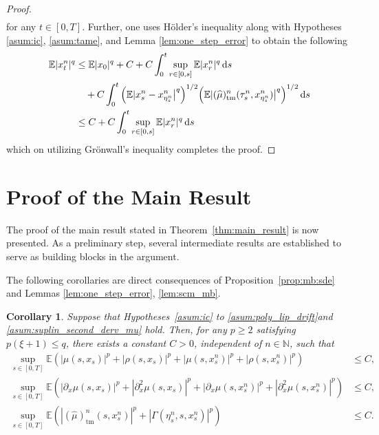 \documentclass[reqno,  oneside, 12pt]{amsart}
\newtheorem{cor}{Corollary}[section]
\newcommand{\E}{\mathbb E}
\begin{document}
\begin{proof}
\begin{align}
	\end{align}
	for any $t\in[ 0, T].$  Further, one uses 	H\"older's inequality along with Hypotheses \ref{asum:ic}, \ref{asum:tame}, and Lemma \ref{lem:one_step_error} to obtain  the following
	\begin{align*}
		\E|x_t^n|^{q}
		&  \leq  \E|x_0|^{q}+C+C\int_0^t\sup_{ r\in[0,s]}\E|x_r^{n}|^{q}\,\mathrm{d}s \notag
		\\
		&\quad+ C\int_{0}^{t}\Big(\E|x_s^{n}-x_{\eta^n_s}^{n}\big|^{{q}}\Big)^{1/2}\Big(\E|(\widehat\mu)_{\mathrm{tm}}^{n}(\tau^n_s,x_{\eta^n_s}^{n})\big|^{{q}}\Big)^{1/2}  \,\mathrm{d}s \notag
		\\
		&  \leq  C+C\int_0^t\sup_{ r\in[0,s]}\E|x_r^{n}|^{q}\,\mathrm{d}s  \notag
	\end{align*}
	which on utilizing  Gr\"onwall's inequality  completes the proof.
\end{proof} 


\section{Proof of the Main  Result} \label{sec:convergence_rate}
The proof of the main result stated in Theorem~\ref{thm:main_result} is now presented. As a preliminary step, several intermediate results are established to serve as building blocks in the argument.

The following corollaries are direct consequences of Proposition~\ref{prop:mb:sde} and Lemmas  \ref{lem:one_step_error}, \ref{lem:scm_mb}.
\begin{cor} \label{cor:_coefficients_mb}
	Suppose that Hypotheses~\mbox{\normalfont\ref{asum:ic}}  to \mbox{\normalfont\ref{asum:poly_lip_drift}}and {\mbox{\normalfont\ref{asum:suplin_second_derv_mu}}} hold. Then, for any \( p \geq 2 \) satisfying \( p(\xi + 1) \leq q \), there exists a constant \( C > 0 \), independent of \( n \in \mathbb{N} \), such that
	\begin{align*}
		\sup_{s \in [0,T]} \mathbb{E} \left( |\mu(s, x_s)|^p +   |\rho(s, x_s)|^p+   |\mu(s, x_s^n)|^p +  |\rho(s, x_s^n)|^p\right) &\leq C, 
		\\
		\sup_{s \in [0,T]} \mathbb{E} \left(|\partial_x \mu(s,x_{s})|^{p}+|\partial_x^2 \mu(s,x_{s})|^{p}+|\partial_x \mu(s,x_{s}^n)|^{p}+|\partial_x^2 \mu(s,x_{s}^n)|^{p}\right)&\leq C, 
		\\
		\sup_{s \in [0,T]} \mathbb{E} \left(|(\widehat\mu)_{\mathrm{tm}}^{n}(s, x_s^n)|^p  + |\Gamma(\eta_s^n, s, x_s^n)|^p\right)  &\leq C.
	\end{align*}
\end{cor}
\end{document}
